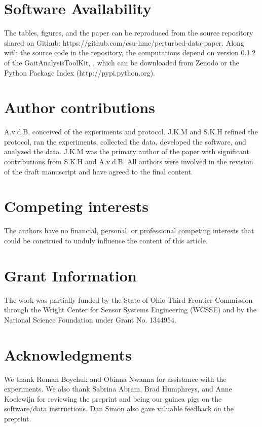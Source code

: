 \documentclass[fleqn,12pt]{wlpeerj}
\begin{document}
\section*{Software Availability}
%
The tables, figures, and the paper can be reproduced from the source
repository shared on Github: https://github.com/csu-hmc/perturbed-data-paper.
Along with the source code in the repository, the computations depend on
version 0.1.2 of the GaitAnalysisToolKit, \cite{Moore2014a}, which can be
downloaded from Zenodo or the Python Package Index (http://pypi.python.org).

\section*{Author contributions}
A.v.d.B. conceived of the experiments and protocol. J.K.M and S.K.H refined the
protocol, ran the experiments, collected the data, developed the software, and
analyzed the data. J.K.M was the primary author of the paper with significant
contributions from S.K.H and A.v.d.B. All authors were involved in the revision
of the draft manuscript and have agreed to the final content.

\section*{Competing interests}
The authors have no financial, personal, or professional competing interests
that could be construed to unduly influence the content of this article.

\section*{Grant Information}
The work was partially funded by the State of Ohio Third Frontier Commission
through the Wright Center for Sensor Systems Engineering (WCSSE) and by the
National Science Foundation under Grant No. 1344954.

\section*{Acknowledgments}
%
We thank Roman Boychuk and Obinna Nwanna for assistance with the experiments.
We also thank Sabrina Abram, Brad Humphreys, and Anne Koelewijn for reviewing
the preprint and being our guinea pigs on the software/data instructions. Dan
Simon also gave valuable feedback on the preprint.


\end{document}
